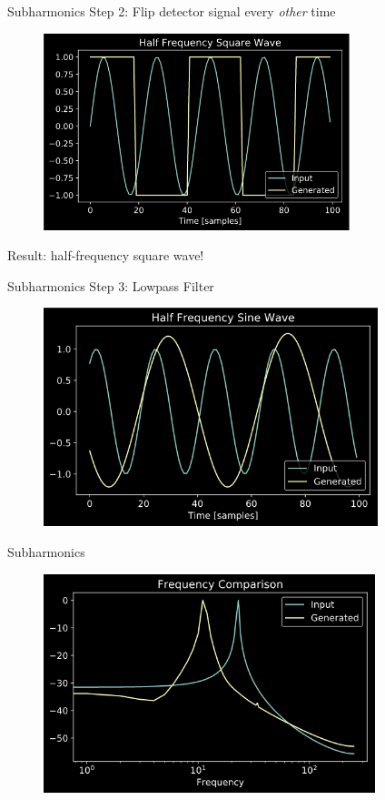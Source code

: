 \begin{frame}{Subharmonics}
    Step 2: Flip detector signal every \emph{other} time
    \begin{figure}
        \centering
        \includegraphics[height=2.25in]{../Subharmonics/Pics/half_square.png}
    \end{figure}
    Result: half-frequency square wave!
\end{frame}

\begin{frame}{Subharmonics}
    Step 3: Lowpass Filter
    \begin{figure}
        \centering
        \includegraphics[height=2.5in]{../Subharmonics/Pics/half_sine.png}
    \end{figure}
\end{frame}

\begin{frame}{Subharmonics}
    \begin{figure}
        \centering
        \includegraphics[height=2.5in]{../Subharmonics/Pics/freq_compare.png}
    \end{figure}
\end{frame}

